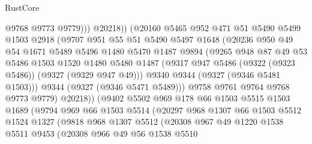 \begin{lexlean}{RustCore}
\begin{coremodule}
                          @9768
                          @9773
                          @9779)))
                    @20218))
                (@20160
                  @5465
                  @952
                  @471
                  @51
                  @5490
                  @5499
                  @1503
                  @2918
                  (@9707
                    @951
                    @55
                    @51
                    @5490
                    @5497
                    @1648
                    (@20236
                      @950
                      @49
                      @54
                      @1671
                      @5489
                      @5496
                      @1480
                      @5470
                      @1487
                      @9894
                      (@9265
                        @948
                        @87
                        @49
                        @53
                        @5486
                        @1503
                        @1520
                        @1480
                        @5480
                        @1487
                        (@9317 @947 @5486 (@9322 (@9323 @5486)) (@9327 (@9329 @947 @49)))
                        @9340
                        @9344
                        (@9327 (@9346 @5481 @1503)))
                      @9344
                      (@9327 (@9346 @5471 @5489)))
                    @9758
                    @9761
                    @9764
                    @9768
                    @9773
                    @9779)
                  @20218))
              (@9402
                @5502
                @969
                @178
                @66
                @1503
                @5515
                @1503
                @1689
                (@9794
                  @969
                  @66
                  @1503
                  @5514
                  (@20297
                    @968
                    @1307
                    @66
                    @1503
                    @5512
                    @1524
                    @1327
                    (@9818
                      @968
                      @1307
                      @5512
                      (@20308
                        @967
                        @49
                        @1220
                        @1538
                        @5511
                        @9453
                        (@20308
                          @966
                          @49
                          @56
                          @1538
                          @5510

\end{coremodule}
\end{lexlean}

